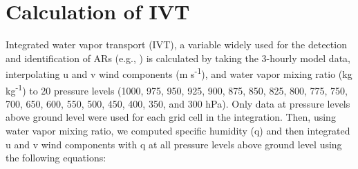 \documentclass[draft]{agujournal2019}
\begin{document}
%
%



%
%
%
%
\appendix
\section{Calculation of IVT}    %
\label{appendix:ivt}
Integrated water vapor transport (IVT), a variable widely used for the detection and identification of ARs (e.g., ) is calculated by taking the 3-hourly model data, interpolating u and v wind components (m s\textsuperscript{-1}), and water vapor mixing ratio (kg kg\textsuperscript{-1}) to 20 pressure levels (1000, 975, 950, 925, 900, 875, 850, 825, 800, 775, 750, 700, 650, 600, 550, 500, 450, 400, 350, and 300 hPa). Only data at pressure levels above ground level were used for each grid cell in the integration. Then, using water vapor mixing ratio, we computed specific humidity (q) and then integrated u and v wind components with q at all pressure levels above ground level using the following equations:
\end{document}
